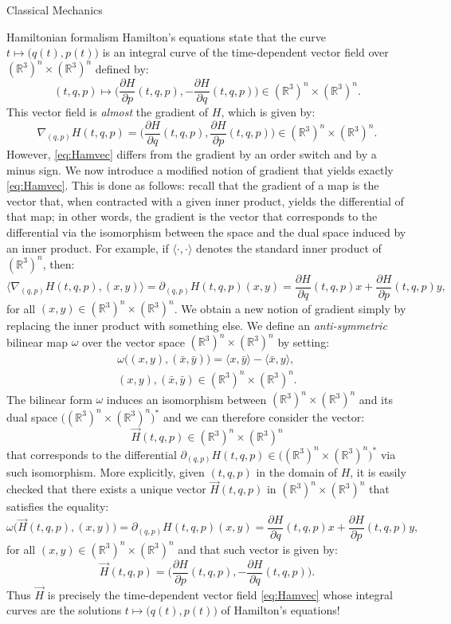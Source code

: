 \documentclass[oneside,a4paper,11pt]{amsbook}
\newcommand{\R}{\mathds R}
\theoremstyle{remark}\newtheorem{exercise}{Exercise}[chapter]
\theoremstyle{plain}\newtheorem{teo}{Theorem}[section]
\theoremstyle{plain}\newtheorem{lem}[teo]{Lemma}
\theoremstyle{plain}\newtheorem{prop}[teo]{Proposition}
\theoremstyle{plain}\newtheorem{cor}[teo]{Corollary}
\theoremstyle{definition}\newtheorem{defin}[teo]{Definition}
\theoremstyle{remark}\newtheorem{rem}[teo]{Remark}
\theoremstyle{definition}\newtheorem{notation}[teo]{Notation}
\theoremstyle{definition}\newtheorem{convention}[teo]{Convention}
\theoremstyle{definition}\newtheorem{example}[teo]{Example}
\numberwithin{section}{chapter}
\numberwithin{equation}{section}
\begin{document}
\begin{chapter}{Classical Mechanics}
\begin{section}{Hamiltonian formalism}
Hamilton's equations state that the curve $t\mapsto\big(q(t),p(t)\big)$ is an integral
curve of the time-dependent vector field over $(\R^3)^n\times(\R^3)^n$ defined by:
\begin{equation}\label{eq:Hamvec}
(t,q,p)\longmapsto\Big(\frac{\partial H}{\partial p}(t,q,p),-\frac{\partial H}{\partial q}(t,q,p)\Big)
\in(\R^3)^n\times(\R^3)^n.
\end{equation}
This vector field is {\em almost\/} the gradient of $H$, which is given by:
\[\nabla_{(q,p)}H(t,q,p)=\Big(\frac{\partial H}{\partial q}(t,q,p),\frac{\partial H}{\partial p}(t,q,p)\Big)
\in(\R^3)^n\times(\R^3)^n.\]
However, \eqref{eq:Hamvec} differs from the gradient by an order switch and by a minus sign.
We now introduce a modified notion of gradient that
yields exactly \eqref{eq:Hamvec}. This is done as follows: recall that the gradient of a map is the vector that,
when contracted with a given inner product, yields the differential of that map; in other words, the gradient is
the vector that corresponds to the differential via the isomorphism between the space and the dual space induced by
an inner product. For example, if $\langle\cdot,\cdot\rangle$
denotes the standard inner product of $(\R^3)^n$, then:
\[\langle\nabla_{(q,p)}H(t,q,p),(x,y)\rangle=\partial_{(q,p)}H(t,q,p)(x,y)
=\frac{\partial H}{\partial q}(t,q,p)x+\frac{\partial H}{\partial p}(t,q,p)y,\]
for all $(x,y)\in(\R^3)^n\times(\R^3)^n$. We obtain a new notion of gradient simply by replacing the inner product
with something else. We define an {\em anti-symmetric\/} bilinear map $\omega$ over the vector space $(\R^3)^n\times(\R^3)^n$ by setting:
\begin{multline}\label{eq:omegaphase}
\omega\big((x,y),(\bar x,\bar y)\big)=\langle x,\bar y\rangle-\langle\bar x,y\rangle,\\
(x,y),(\bar x,\bar y)\in(\R^3)^n\times(\R^3)^n.
\end{multline}
The bilinear form $\omega$ induces an isomorphism between $(\R^3)^n\times(\R^3)^n$ and its dual space
$\big((\R^3)^n\times(\R^3)^n\big)^*$ and we can therefore consider the vector:
\[\vec H(t,q,p)\in(\R^3)^n\times(\R^3)^n\]
that corresponds to the differential $\partial_{(q,p)}H(t,q,p)\in\big((\R^3)^n\times(\R^3)^n\big)^*$ via such isomorphism.
More explicitly, given $(t,q,p)$ in the domain of $H$, it is easily checked that there exists a unique vector
$\vec H(t,q,p)$ in $(\R^3)^n\times(\R^3)^n$ that satisfies the equality:
\[\omega\big(\vec H(t,q,p),(x,y)\big)=\partial_{(q,p)}H(t,q,p)(x,y)
=\frac{\partial H}{\partial q}(t,q,p)x+\frac{\partial H}{\partial p}(t,q,p)y,\]
for all $(x,y)\in(\R^3)^n\times(\R^3)^n$ and that such vector is given by:
\[\vec H(t,q,p)=\Big(\frac{\partial H}{\partial p}(t,q,p),-\frac{\partial H}{\partial q}(t,q,p)\Big).\]
Thus $\vec H$ is precisely the time-dependent vector field \eqref{eq:Hamvec} whose integral curves are the solutions
$t\mapsto\big(q(t),p(t)\big)$ of Hamilton's equations!


\end{section}
\end{chapter}
\end{document}
